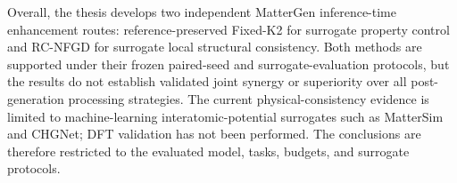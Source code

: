 \begin{EnglishAbstract}
Overall, the thesis develops two independent MatterGen inference-time enhancement routes: reference-preserved Fixed-K2 for surrogate property control and RC-NFGD for surrogate local structural consistency. Both methods are supported under their frozen paired-seed and surrogate-evaluation protocols, but the results do not establish validated joint synergy or superiority over all post-generation processing strategies. The current physical-consistency evidence is limited to machine-learning interatomic-potential surrogates such as MatterSim and CHGNet; DFT validation has not been performed. The conclusions are therefore restricted to the evaluated model, tasks, budgets, and surrogate protocols.

\end{EnglishAbstract}
